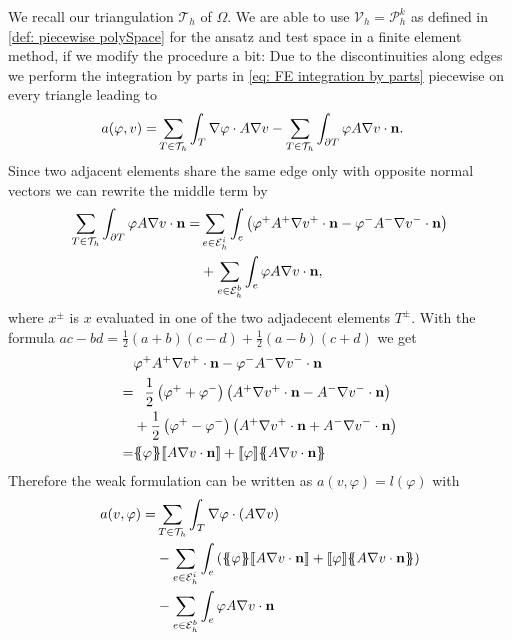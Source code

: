 We recall our triangulation $\mathcal{T}_h$ of $\Omega$. We are able to use $\mathcal V_h = \mathcal P_h^k$ as defined in \ref*{def: piecewise polySpace} for the ansatz and test space in a finite element method, if we modify the procedure a bit: Due to the discontinuities along edges we perform the integration by parts in \eqref{eq: FE integration by parts} piecewise on every triangle leading to
\begin{align}
	a(\varphi, v) = & \sum_{T \in \mathcal{T}_h} \int_T \nabla \varphi \cdot A \nabla v - \sum_{T \in \mathcal{T}_h} \int_{\partial T} \varphi A \nabla v \cdot \mathbf n.
\end{align}
Since two adjacent elements share the same edge only with opposite normal vectors we can rewrite the middle term by
\begin{align*}
\sum\limits_{T \in \mathcal{T}_h}\int_{\partial T} \varphi A \nabla v \cdot \mathbf n 
= &\sum\limits_{e \in \mathcal{E}_h^i}\int_{e} \left( \varphi^+ A^+ \nabla v^+ \cdot \mathbf n - \varphi^- A^- \nabla v^- \cdot \mathbf n \right) \\
& + \sum\limits_{e \in \mathcal{E}_h^b}\int_{e} \varphi A \nabla v \cdot \mathbf n,
\end{align*}
where $x^\pm $ is $x$ evaluated in one of the two adjadecent elements $T^\pm$. With the formula $ac-bd = \frac 1 2 (a+b)(c-d) + \frac 1 2 (a-b)(c+d)$ we get
\begin{align*}
	&\varphi^+ A^+ \nabla v^+ \cdot \mathbf n - \varphi^- A^- \nabla v^- \cdot \mathbf n \\
	= & \phantom{+} \frac 1 2 \left(\varphi^+ + \varphi^- \right) \left(A^+ \nabla v^+ \cdot \mathbf n - A^- \nabla v^- \cdot \mathbf n \right) \\
  &+  \frac 1 2 \left(\varphi^+ - \varphi^- \right) \left(A^+ \nabla v^+ \cdot \mathbf n + A^- \nabla v^- \cdot \mathbf n \right) \\
  = &  \average \varphi \jump { A \nabla v \cdot \mathbf n }+ \jump \varphi \average{ A \nabla v \cdot  \mathbf n }
\end{align*}
Therefore the weak formulation can be written as $a(v,\varphi) = l(\varphi)$ with 
\begin{align*}
  a(v, \varphi) = & \sum\limits_{T \in \triang} \int_T \nabla \varphi \cdot \left(A \nabla v\right) \\
	& - \sum\limits_{e \in \edgesi}\int_{e} \left( \average \varphi \jump {A \nabla v \cdot \mathbf n } + \jump \varphi \average{ A \nabla v \cdot \mathbf n } \right)\\
& - \sum\limits_{e \in \edgesb}\int_{e} \varphi A \nabla v \cdot \mathbf n
\end{align*}
